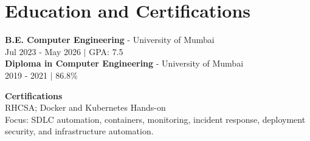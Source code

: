\documentclass[9pt,a4paper]{article}
\begin{document}
\section{Education and Certifications}
\noindent\begin{minipage}[t]{0.49\textwidth}\vspace{0pt}
\textbf{B.E. Computer Engineering} - University of Mumbai\\[-1pt]
{\footnotesize\color{muted}Jul 2023 - May 2026 $|$ GPA: 7.5}\\[1pt]
\textbf{Diploma in Computer Engineering} - University of Mumbai\\[-1pt]
{\footnotesize\color{muted}2019 - 2021 $|$ 86.8\%}
\end{minipage}\hfill
\begin{minipage}[t]{0.49\textwidth}\vspace{0pt}
\textbf{Certifications}\\[-1pt]
RHCSA; Docker and Kubernetes Hands-on\\[2pt]
{\footnotesize\color{muted}Focus: SDLC automation, containers, monitoring, incident response, deployment security, and infrastructure automation.}
\end{minipage}
\end{document}
